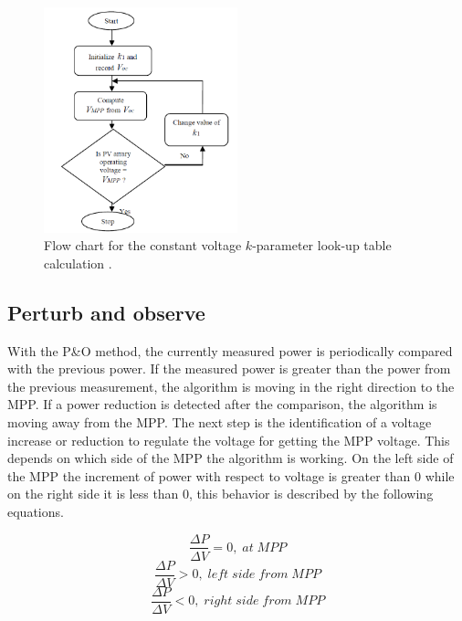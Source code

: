 \begin{figure}[H]
	\begin{center}
		\includegraphics[width=0.5\textwidth]{../Pictures/P1/Flow_chart/Flow_chart_constant_voltage}
		\caption{Flow chart for the constant voltage $k$-parameter look-up table calculation \cite{flowchartVC}. }
		\label{fcconstantvoltage}
	\end{center}	
\end{figure}


\subsection{Perturb and observe}
With the P\&O method, the currently measured power is periodically compared with the previous power. If the measured power is greater than the power from the previous measurement, the algorithm is moving in the right direction to the MPP. If a power reduction is detected after the comparison, the algorithm is moving away from the MPP. The next step is the identification of a voltage increase or reduction to regulate the voltage for getting the MPP voltage.
This depends on which side of the MPP the algorithm is working.
On the left side of the MPP the increment of power with respect to voltage is greater than 0 while on the right side it is less than 0, this behavior is described by the following equations. \cite{AN1521_MC}

\begin{equation} \label{PO1}
\frac{\Delta P}{\Delta V} = 0 ,\; at\; MPP 
\end{equation} 
\begin{equation} \label{PO2}
\frac{\Delta P}{\Delta V} > 0 ,\; left\; side\; from\; MPP 
\end{equation}
\begin{equation} \label{PO3}
\frac{\Delta P}{\Delta V} < 0 ,\; right\; side\; from\; MPP
\end{equation}


